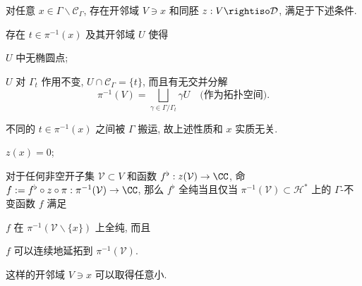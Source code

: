 \begin{lemma}\label{prop:glueing-holomorphy-cusp}
	对任意 $x \in \Gamma \backslash \mathcal{C}_\Gamma$, 存在开邻域 $V \ni x$ 和同胚 $z: V \rightiso \mathcal{D}$, 满足于下述条件.
	\begin{compactitem}
		\item 存在 $t \in \pi^{-1}(x)$ 及其开邻域 $U$ 使得
		\begin{compactitem}
			\item $U$  中无椭圆点;
			\item $U$ 对 $\Gamma_t$ 作用不变, $U \cap \mathcal{C}_\Gamma = \{t\}$, 而且有无交并分解
			\[ \pi^{-1}(V) = \bigsqcup_{\gamma \in  \Gamma/\Gamma_t} \gamma U \quad \text{(作为拓扑空间)}. \]
		\end{compactitem}
		不同的 $t \in \pi^{-1}(x)$ 之间被 $\Gamma$ 搬运, 故上述性质和 $x$ 实质无关.
		\item $z(x) = 0$;
		\item 对于任何非空开子集 $\mathcal{V} \subset V$ 和函数 $f^\flat: z(\mathcal{V}) \to \CC$, 命 $f := f^\flat \circ z \circ \pi: \pi^{-1}(\mathcal{V}) \to \CC$, 那么 $f^\flat$ 全纯当且仅当 $\pi^{-1}(\mathcal{V}) \subset \mathcal{H}^*$ 上的 $\Gamma$-不变函数 $f$ 满足
		\begin{compactitem}
			\item $f$ 在 $\pi^{-1}(\mathcal{V} \smallsetminus \{x\})$ 上全纯, 而且
			\item $f$ 可以连续地延拓到 $\pi^{-1}(\mathcal{V})$.
		\end{compactitem}
	\end{compactitem}
	这样的开邻域 $V \ni x$ 可以取得任意小.
\end{lemma}
